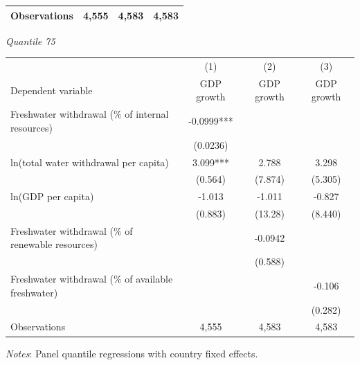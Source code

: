 \begin{table}[htbp]
\begin{tabular}{lccc}
\hline
Observations & 4,555 & 4,583 & 4,583 \\
\hline
\end{tabular}
\vspace{0.75em}
\textit{Quantile 75}\\
\begin{tabular}{lccc}
\hline
 & (1) & (2) & (3) \\
Dependent variable & GDP growth & GDP growth & GDP growth \\
\hline
Freshwater withdrawal (\% of internal resources) & -0.0999*** &  &  \\
 & (0.0236) &  &  \\
ln(total water withdrawal per capita) & 3.099*** & 2.788 & 3.298 \\
 & (0.564) & (7.874) & (5.305) \\
ln(GDP per capita) & -1.013 & -1.011 & -0.827 \\
 & (0.883) & (13.28) & (8.440) \\
Freshwater withdrawal (\% of renewable resources) &  & -0.0942 &  \\
 &  & (0.588) &  \\
Freshwater withdrawal (\% of available freshwater) &  &  & -0.106 \\
 &  &  & (0.282) \\
\hline
Observations & 4,555 & 4,583 & 4,583 \\
\hline
\end{tabular}
\vspace{0.5em}
\parbox{0.95\textwidth}{\footnotesize \textit{Notes}: Panel quantile regressions with country fixed effects.}
\end{table}
